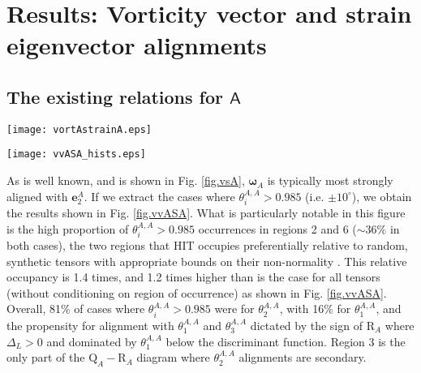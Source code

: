 \documentclass[preprint,amssymb,amsmath,aip,cha]{revtex4-1}
\begin{document}
\section{Results: Vorticity vector and strain eigenvector alignments}
\subsection{The existing relations for $\mathsf{A}$}
\begin{figure*}
  \texttt{[image: vortAstrainA.eps]}
\caption{The probability curves for the alignments, $\theta^{A,A}_{i}$ between the vorticity vector and the strain eigenvectors for $\mathsf{A}$. The black solid line is for $i =1$, the dashed line is for $i = 2$ and the grey line is for $i = 3$.
}
\label{fig.vsA}   
\end{figure*}

\begin{figure*}
  \texttt{[image: vvASA\_hists.eps]}
\caption{Given $\theta^{A,A}_{i} > 0.985$, the bars show the probability of the alignments for particular \emph{i}.  The percentage value in brackets in each panel is the sum of the values in each panel. The number beneath this is the ratio between this percentage and that given for this region of the $\mbox{Q}_{A}-\mbox{R}_{A}$ diagram in Table \ref{table.Q_wws_sss}.
}
\label{fig.vvASA}   
\end{figure*}

As is well known, and is shown in Fig. \ref{fig.vsA}, $\boldsymbol{\omega}_{A}$ is typically most strongly aligned with $\mathbf{e}^{A}_{2}$. If we extract the cases where $\theta^{A,A}_{i} > 0.985$ (i.e. $\pm 10^{\circ}$), we obtain the results shown in Fig. \ref{fig.vvASA}. What is particularly notable in this figure is the high proportion of $\theta^{A,A}_{i} > 0.985$ occurrences in regions 2 and 6 ($\sim 36\%$ in both cases), the two regions that HIT occupies preferentially relative to random, synthetic tensors with appropriate bounds on their non-normality \citep{k17}. This relative occupancy is 1.4 times, and 1.2 times higher than is the case for all tensors (without conditioning on region of occurrence) as shown in Fig. \ref{fig.vvASA}. Overall, 81\% of cases where $\theta^{A,A}_{i} > 0.985$ were for $\theta^{A,A}_{2}$, with 16\% for $\theta^{A,A}_{1}$, and the propensity for alignment with $\theta^{A,A}_{1}$ and $\theta^{A,A}_{3}$ dictated by the sign of $\mbox{R}_{A}$ where $\Delta_{L} > 0$ and dominated by $\theta^{A,A}_{1}$ below the discriminant function. Region 3 is the only part of the $\mbox{Q}_{A}-\mbox{R}_{A}$ diagram where $\theta^{A,A}_{2}$ alignments are secondary.
\end{document}
